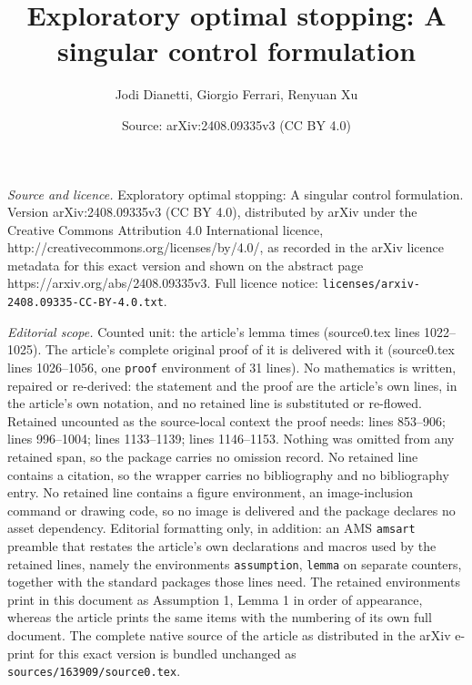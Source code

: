 \documentclass[10pt,a4paper]{amsart}
\title{Exploratory optimal stopping: A singular control formulation}
\author{Jodi Dianetti, Giorgio Ferrari, Renyuan Xu}
\date{Source: arXiv:2408.09335v3 (CC BY 4.0)}
\begin{document}
\maketitle

\noindent\emph{Source and licence.} Exploratory optimal stopping: A singular control formulation. Version arXiv:2408.09335v3 (CC BY 4.0), distributed by arXiv under the Creative Commons Attribution 4.0 International licence, http://creativecommons.org/licenses/by/4.0/, as recorded in the arXiv licence metadata for this exact version and shown on the abstract page https://arxiv.org/abs/2408.09335v3. Full licence notice: \texttt{licenses/arxiv-2408.09335-CC-BY-4.0.txt}.\par\smallskip

\noindent\textit{Editorial scope.} Counted unit: the article's lemma times (source0.tex lines 1022--1025). The article's complete original proof of it is delivered with it (source0.tex lines 1026--1056, one \texttt{proof} environment of 31 lines). No mathematics is written, repaired or re-derived: the statement and the proof are the article's own lines, in the article's own notation, and no retained line is substituted or re-flowed.  Retained uncounted as the source-local context the proof needs: lines 853--906; lines 996--1004; lines 1133--1139; lines 1146--1153.  Nothing was omitted from any retained span, so the package carries no omission record.  No retained line contains a citation, so the wrapper carries no bibliography and no bibliography entry.  No retained line contains a figure environment, an image-inclusion command or drawing code, so no image is delivered and the package declares no asset dependency.  Editorial formatting only, in addition: an AMS \texttt{amsart} preamble that restates the article's own declarations and macros used by the retained lines, namely the environments \texttt{assumption}, \texttt{lemma} on separate counters, together with the standard packages those lines need.  The retained environments print in this document as Assumption 1, Lemma 1 in order of appearance, whereas the article prints the same items with the numbering of its own full document.  The complete native source of the article as distributed in the arXiv e-print for this exact version is bundled unchanged as \texttt{sources/163909/source0.tex}.
\end{document}
